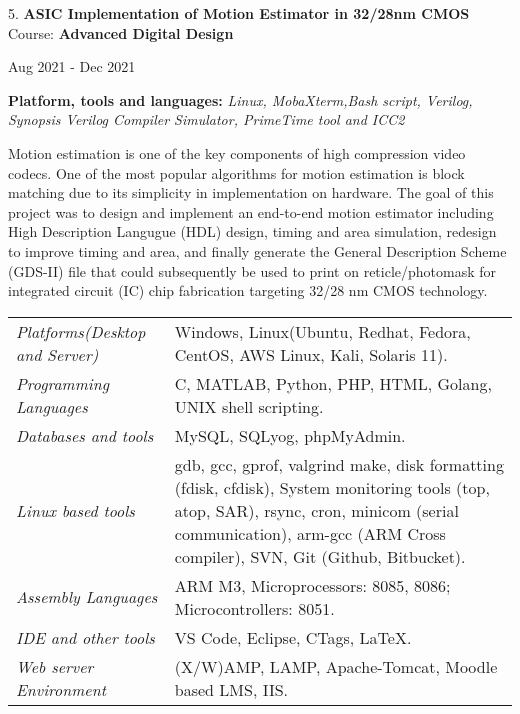 \documentclass[10pt]{article}
\renewcommand{\section}[2]%
        {\pagebreak[3]\vspace{1.3\baselineskip}%
         \phantomsection\addcontentsline{toc}{section}{#1}%
         \hspace{0in}%
         \marginpar{
         \raggedright \scshape #1}#2}
\newenvironment{innerlist}[1][\enskip\textbullet]%
        {\begin{compactitem}[#1]}{\end{compactitem}}
\newenvironment{loneinnerlist}[1][\enskip\textbullet]%
        {\vspace{-\baselineskip}\begin{compactitem}[#1]}
        {\end{compactitem}\vspace{-.6\baselineskip}}
\begin{document}
\begin{loneinnerlist}
\item[5.]\textbf{ASIC Implementation of Motion Estimator in 32/28nm CMOS} \\ 
\vspace{4pt}
Course: \textbf{Advanced Digital Design} \\
\vspace*{-28pt} \begin{flushright} Aug 2021 - Dec 2021 \end{flushright}
\textbf{Platform, tools and languages:} \emph{Linux, MobaXterm,Bash script, Verilog, Synopsis Verilog Compiler Simulator, PrimeTime tool and ICC2}
\vspace*{2pt}
\begin{innerlist} \item Motion estimation is one of the key components of high compression video codecs. One of the most popular algorithms for motion estimation is block matching due to its simplicity in implementation on hardware. The goal of this project was to design and implement an end-to-end motion estimator including High Description Langugue (HDL) design, timing and area simulation, redesign to improve timing and area, and finally generate the General Description Scheme (GDS-II) file that could subsequently be used to print on reticle/photomask for integrated circuit (IC) chip fabrication targeting 32/28 nm CMOS technology.
\end{innerlist}  \vspace*{4pt}
\end{loneinnerlist}%


\section{Skills}
%
\begin{tabular}[t]{l p{2.9in}}
\emph{Platforms(Desktop and Server)}  &  Windows, Linux(Ubuntu, Redhat, Fedora, CentOS, AWS Linux, Kali, Solaris 11).\\
\emph{Programming Languages}  & C, MATLAB, Python, PHP, HTML, Golang, UNIX shell scripting.\\
\emph{Databases and tools}  & MySQL, SQLyog, phpMyAdmin.\\
\emph{Linux based tools}  &  gdb, gcc, gprof, valgrind make, disk formatting (fdisk, cfdisk), System monitoring tools (top, atop, SAR), rsync, cron, minicom (serial communication), arm-gcc (ARM Cross compiler), SVN, Git (Github, Bitbucket).\\
\emph{Assembly Languages}  &  ARM M3, Microprocessors: 8085, 8086; Microcontrollers: 8051.\\
\emph{IDE and other tools}  & VS Code, Eclipse, CTags, \LaTeX{}.\\
\emph{Web server Environment}  & (X/W)AMP, LAMP, Apache-Tomcat, Moodle based LMS, IIS.\\
\end{tabular}
\end{document}
